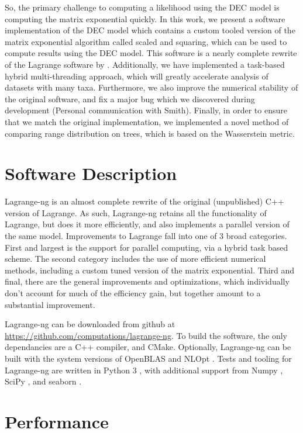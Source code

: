 \documentclass[oupdraft]{sysbio}
\begin{document}
So, the primary challenge to computing a likelihood using the DEC model is computing the matrix exponential quickly. In
this work, we present a software implementation of the DEC model which contains a custom tooled version of the matrix
exponential algorithm called scaled and squaring, which can be used to compute results using the DEC model. This
software is a nearly complete rewrite of the Lagrange software by \citet{ree_likelihood_2005}. Additionally, we have
implemented a task-based hybrid multi-threading approach, which will greatly accelerate analysis of datasets with many
taxa. Furthermore, we also improve the numerical stability of the original software, and fix a major bug which we
discovered during development (Personal communication with Smith). Finally, in order to ensure that we match the
original implementation, we implemented a novel method of comparing range distribution on trees, which is based on the
Wasserstein metric.

\bigskip
\section{Software Description}\label{sec:description}

Lagrange-ng is an almost complete rewrite of the original (unpublished) C++ version of Lagrange. As such, Lagrange-ng
retains all the functionality of Lagrange, but does it more efficiently, and also implements a parallel version of the
same model. Improvements to Lagrange fall into one of 3 broad categories. First and largest is the support for parallel
computing, via a hybrid task based scheme. The second category includes the use of more efficient numerical methods,
including a custom tuned version of the matrix exponential. Third and final, there are the general improvements and
optimizations, which individually don't account for much of the efficiency gain, but together amount to a substantial
improvement.

Lagrange-ng can be downloaded from github at \url{https://github.com/computations/lagrange-ng}. To build the software,
the only dependancies are a C++ compiler, and CMake. Optionally, Lagrange-ng can be built with the system versions of
OpenBLAS \citep{openblas} and NLOpt \citep{nelder_simplex_1965, johnson_stevengjnlopt_2021}. Tests and tooling for
Lagrange-ng are written in Python 3 \citep{python3}, with additional support from Numpy \citep{numpy}, SciPy
\citep{scipy}, and seaborn \citep{Waskom2021}.

\bigskip
\section{Performance}\label{sec:performance}
\end{document}
